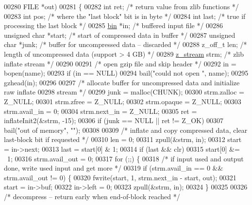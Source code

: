 \begin{DoxyCode}
{00280                   FILE *out)
00281 \{
00282     \textcolor{keywordtype}{int} ret;                \textcolor{comment}{/* return value from zlib functions */}
00283     \textcolor{keywordtype}{int} pos;                \textcolor{comment}{/* where the "last block" bit is in byte */}
00284     \textcolor{keywordtype}{int} last;               \textcolor{comment}{/* true if processing the last block */}
00285     \hyperlink{structbin}{bin} *in;                \textcolor{comment}{/* buffered input file */}
00286     \textcolor{keywordtype}{unsigned} \textcolor{keywordtype}{char} *start;   \textcolor{comment}{/* start of compressed data in buffer */}
00287     \textcolor{keywordtype}{unsigned} \textcolor{keywordtype}{char} *junk;    \textcolor{comment}{/* buffer for uncompressed data -- discarded */}
00288     z\_off\_t len;            \textcolor{comment}{/* length of uncompressed data (support > 4 GB) */}
00289     \hyperlink{structz__stream__s}{z\_stream} strm;          \textcolor{comment}{/* zlib inflate stream */}
00290 
00291     \textcolor{comment}{/* open gzip file and skip header */}
00292     in = bopen(name);
00293     \textcolor{keywordflow}{if} (in == NULL)
00294         bail(\textcolor{stringliteral}{"could not open "}, name);
00295     gzhead(in);
00296 
00297     \textcolor{comment}{/* allocate buffer for uncompressed data and initialize raw inflate}
00298 \textcolor{comment}{       stream */}
00299     junk = malloc(CHUNK);
00300     strm.zalloc = Z\_NULL;
00301     strm.zfree = Z\_NULL;
00302     strm.opaque = Z\_NULL;
00303     strm.avail\_in = 0;
00304     strm.next\_in = Z\_NULL;
00305     ret = inflateInit2(&strm, -15);
00306     \textcolor{keywordflow}{if} (junk == NULL || ret != Z\_OK)
00307         bail(\textcolor{stringliteral}{"out of memory"}, \textcolor{stringliteral}{""});
00308 
00309     \textcolor{comment}{/* inflate and copy compressed data, clear last-block bit if requested */}
00310     len = 0;
00311     zpull(&strm, in);
00312     start = in->next;
00313     last = start[0] & 1;
00314     \textcolor{keywordflow}{if} (last && clr)
00315         start[0] &= ~1;
00316     strm.avail\_out = 0;
00317     \textcolor{keywordflow}{for} (;;) \{
00318         \textcolor{comment}{/* if input used and output done, write used input and get more */}
00319         \textcolor{keywordflow}{if} (strm.avail\_in == 0 && strm.avail\_out != 0) \{
00320             fwrite(start, 1, strm.next\_in - start, out);
00321             start = in->buf;
00322             in->left = 0;
00323             zpull(&strm, in);
00324         \}
00325 
00326         \textcolor{comment}{/* decompress -- return early when end-of-block reached */}
}
\end{DoxyCode}
